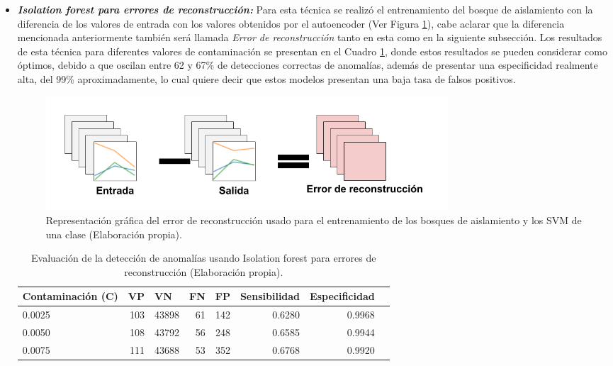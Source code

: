 \begin{itemize}
\item \textbf{\textit{Isolation forest para errores de reconstrucci\'{o}n: }}Para esta t\'{e}cnica se realiz\'{o} el entrenamiento del bosque de aislamiento con la diferencia de los valores de entrada con los valores obtenidos por el autoencoder (Ver Figura \ref{fig:error}), cabe aclarar que la diferencia mencionada anteriormente tambi\'{e}n ser\'{a} llamada \textit{Error de reconstrucci\'{o}n} tanto en esta como en la siguiente subsecci\'{o}n. Los resultados de esta t\'{e}cnica para diferentes valores de contaminaci\'{o}n se presentan en el Cuadro \ref{table:evaluacion_IF_errores_reconstruccion}, donde estos resultados se pueden considerar como \'{o}ptimos, debido a que oscilan entre 62 y 67\% de detecciones correctas de anomal\'{i}as, adem\'{a}s de presentar una especificidad realmente alta, del 99\% aproximadamente, lo cual quiere decir que estos modelos presentan una baja tasa de falsos positivos. 

\begin{figure}[H]
        \centering
            \includegraphics[width=0.75\textwidth, frame]{imagenes/Cap5/error}
        \caption{Representaci\'{o}n gr\'{a}fica del error de reconstrucci\'{o}n usado para el entrenamiento de los bosques de aislamiento y los SVM de una clase (Elaboraci\'{o}n propia).}
		\label{fig:error}
\end{figure}

\begin{table}[H]
\centering
\begin{center}
\begin{tabular}{|l|r|r|r|r|r|r|r|}
\hline
\textbf{Contaminaci\'{o}n (C)} & \multicolumn{1}{l|}{\textbf{VP}} & \multicolumn{1}{l|}{\textbf{VN}}& \multicolumn{1}{l|}{\textbf{FN}}& \multicolumn{1}{l|}{\textbf{FP}} & \multicolumn{1}{l|}{\textbf{Sensibilidad}} & \multicolumn{1}{l|}{\textbf{Especificidad}} \\ \hline
0.0025 & \cellcolor[HTML]{AADD99} 103 & \cellcolor[HTML]{AADD99} 43898 & \cellcolor[HTML]{FFCE93} 61 & \cellcolor[HTML]{FFCE93} 142 & 0.6280 & 0.9968 \\ \hline
0.0050 & \cellcolor[HTML]{AADD99} 108 & \cellcolor[HTML]{AADD99} 43792 & \cellcolor[HTML]{FFCE93} 56 & \cellcolor[HTML]{FFCE93} 248 & 0.6585 & 0.9944 \\ \hline
0.0075 & \cellcolor[HTML]{AADD99} 111 & \cellcolor[HTML]{AADD99} 43688 & \cellcolor[HTML]{FFCE93} 53 & \cellcolor[HTML]{FFCE93} 352 & 0.6768 & 0.9920 \\ \hline
\end{tabular}
\end{center}
\caption{Evaluaci\'{o}n de la detecci\'{o}n de anomal\'{i}as usando Isolation forest para errores de reconstrucci\'{o}n (Elaboraci\'{o}n propia).}
\label{table:evaluacion_IF_errores_reconstruccion}
\end{table}
\end{itemize}

